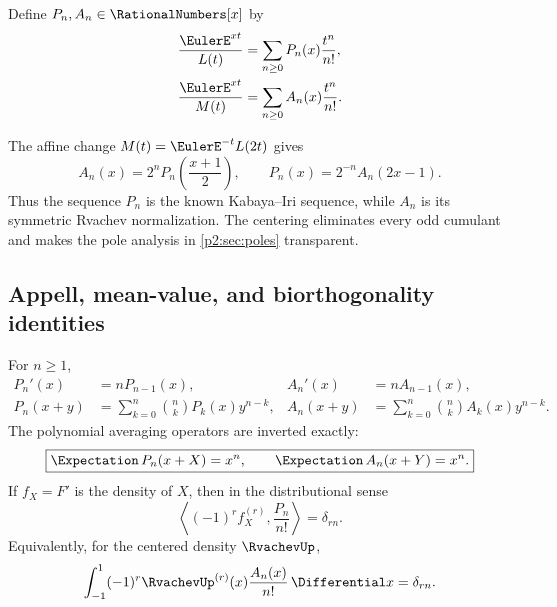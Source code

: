 \documentclass[11pt,oneside]{article}
\numberwithin{equation}{section}
\theoremstyle{definition}
\theoremstyle{remark}
\begin{document}
\begin{definition}
\label{p2:def:Appell-polys}
Define $P_n,A_n\in\RationalNumbers[x]$ by
\begin{align}
 \frac{\EulerE^{xt}}{L(t)}
 &=\sum_{n\ge0}P_n(x)\frac{t^n}{n!},
 \label{p2:eq:P-generating}\\
 \frac{\EulerE^{xt}}{M(t)}
 &=\sum_{n\ge0}A_n(x)\frac{t^n}{n!}.
 \label{p2:eq:A-generating}
\end{align}
\end{definition}

The affine change $M(t)=\EulerE^{-t}L(2t)$ gives
\begin{equation}
 \boxed{
 A_n(x)=2^nP_n\!\left(\frac{x+1}{2}\right),
 \qquad
 P_n(x)=2^{-n}A_n(2x-1).
 }
 \label{p2:eq:A-P-affine}
\end{equation}
Thus the sequence $P_n$ is the known Kabaya--Iri sequence, while $A_n$ is its symmetric Rvachev
normalization.  The centering eliminates every odd cumulant and makes the pole analysis in
\cref{p2:sec:poles} transparent.

\subsection{Appell, mean-value, and biorthogonality identities}

\begin{proposition}
\label{p2:prop:Appell-package}
For $n\ge1$,
\begin{align}
 P_n'(x)&=nP_{n-1}(x),
 &A_n'(x)&=nA_{n-1}(x),
 \label{p2:eq:Appell-derivative}\\
 P_n(x+y)&=\sum_{k=0}^n\binom nkP_k(x)y^{n-k},
 &A_n(x+y)&=\sum_{k=0}^n\binom nkA_k(x)y^{n-k}.
 \label{p2:eq:Appell-translation}
\end{align}
The polynomial averaging operators are inverted exactly:
\begin{equation}
 \boxed{
 \Expectation\,P_n(x+X)=x^n,
 \qquad
 \Expectation\,A_n(x+Y)=x^n.
 }
 \label{p2:eq:mean-value-inversion}
\end{equation}
If $f_X=F'$ is the density of $X$, then in the distributional sense
\begin{equation}
 \left\langle(-1)^r f_X^{(r)},\frac{P_n}{n!}\right\rangle=\delta_{rn}.
 \label{p2:eq:P-biorthogonal}
\end{equation}
Equivalently, for the centered density $\RvachevUp$,
\begin{equation}
 \int_{-1}^{1}(-1)^r\RvachevUp^{(r)}(x)\frac{A_n(x)}{n!}\,\Differential x
 =\delta_{rn}.
 \label{p2:eq:A-biorthogonal}
\end{equation}
\end{proposition}
\end{document}
